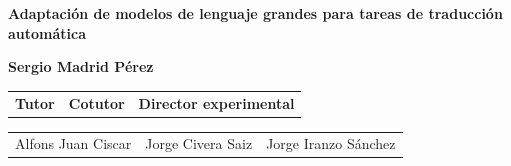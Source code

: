 \documentclass[landscape,spanish]{article}
\renewcommand{\today}{16 de Julio, 2024}
\renewcommand{\title}{Adaptación de modelos de lenguaje grandes para tareas de traducción automática}
\renewcommand{\author}{Sergio Madrid Pérez}
\begin{document}
\thispagestyle{empty}










\begin{center}

	\rule{0mm}{35mm}
	\Large{\Large\textbf{\color{darkred}\title}}

	\rule{0mm}{30mm}
	{\normalsize \fontsize{22}{20} \textbf{\color{greyblue}\author}}
	\vspace{-10mm}

	\rule{0mm}{0mm}
	\begin{table}[ht!]
		\centering
		\begin{tabularx}{\textwidth}{YYY}
			\small \color{greyblue} \textbf{Tutor} &
			\small \color{greyblue} \textbf{Cotutor} &
			\small \color{greyblue} \textbf{Director experimental}\\
		\end{tabularx}
	\end{table}
	\vspace{-15mm}
	\begin{table}[ht!]
		\centering
		\begin{tabularx}{\textwidth}{YYY}
			\small \color{greyblue} Alfons Juan Ciscar & 
			\small \color{greyblue} Jorge Civera Saiz & 
			\small \color{greyblue} Jorge Iranzo Sánchez\\
		\end{tabularx}
	\end{table}
\end{center}
\end{document}
